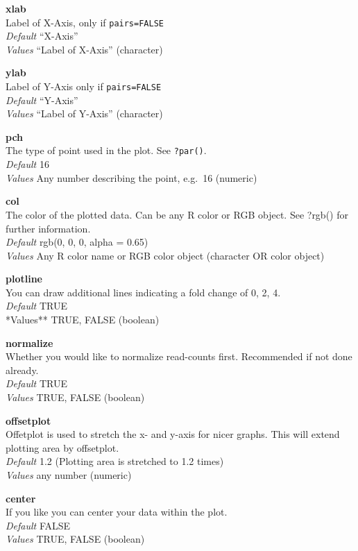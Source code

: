 \documentclass[]{article}
\begin{document}
\textbf{xlab}\\
Label of X-Axis, only if \texttt{pairs=FALSE}\\
\emph{Default} ``X-Axis''\\
\emph{Values} ``Label of X-Axis'' (character)

\textbf{ylab}\\
Label of Y-Axis only if \texttt{pairs=FALSE}\\
\emph{Default} ``Y-Axis''\\
\emph{Values} ``Label of Y-Axis'' (character)

\textbf{pch}\\
The type of point used in the plot. See \texttt{?par()}.\\
\emph{Default} 16\\
\emph{Values} Any number describing the point, e.g.~16 (numeric)

\textbf{col}\\
The color of the plotted data. Can be any R color or RGB object. See
?rgb() for further information.\\
\emph{Default} rgb(0, 0, 0, alpha = 0.65)\\
\emph{Values} Any R color name or RGB color object (character OR color
object)

\textbf{plotline}\\
You can draw additional lines indicating a fold change of 0, 2, 4.\\
\emph{Default} TRUE\\
*Values** TRUE, FALSE (boolean)

\textbf{normalize}\\
Whether you would like to normalize read-counts first. Recommended if
not done already.\\
\emph{Default} TRUE\\
\emph{Values} TRUE, FALSE (boolean)

\textbf{offsetplot}\\
Offetplot is used to stretch the x- and y-axis for nicer graphs. This
will extend plotting area by offsetplot.\\
\emph{Default} 1.2 (Plotting area is stretched to 1.2 times)\\
\emph{Values} any number (numeric)

\textbf{center}\\
If you like you can center your data within the plot.\\
\emph{Default} FALSE\\
\emph{Values} TRUE, FALSE (boolean)
\end{document}
